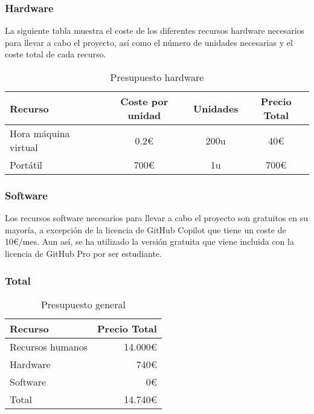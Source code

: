 \subsubsection{Hardware}
La siguiente tabla muestra el coste de los diferentes recursos hardware
necesarios para llevar a cabo el proyecto, así como el número de unidades
necesarias y el coste total de cada recurso.

\begin{table}[ht]
    \centering
    \begin{tabular}[ht]{l|c|c|c}
        \textbf{Recurso}     & \textbf{Coste por unidad} & \textbf{Unidades} & \textbf{Precio Total} \\
        \hline
        Hora máquina virtual & 0.2\euro                  & 200u              & 40\euro               \\
        Portátil             & 700\euro                  & 1u                & 700\euro              \\
    \end{tabular}
    \caption{Presupuesto hardware}
    \label{tab:hardware-budget}
\end{table}

\subsubsection{Software}
Los recursos software necesarios para llevar a cabo el proyecto son gratuitos
en su mayoría, a excepción de la licencia de GitHub Copilot que tiene un coste
de 10\euro/mes. Aun así, se ha utilizado la versión gratuita que viene incluida
con la licencia de GitHub Pro por ser estudiante.

\subsubsection{Total}
\begin{table}
    \centering
    \begin{tabular}[ht]{l|r}
        \textbf{Recurso} & \textbf{Precio Total} \\
        \hline
        Recursos humanos & 14.000\euro           \\
        Hardware         & 740\euro              \\
        Software         & 0\euro                \\
        \hline
        Total            & 14.740\euro           \\
    \end{tabular}
    \caption{Presupuesto general}
    \label{tab:total-budget}
\end{table}

\pagebreak